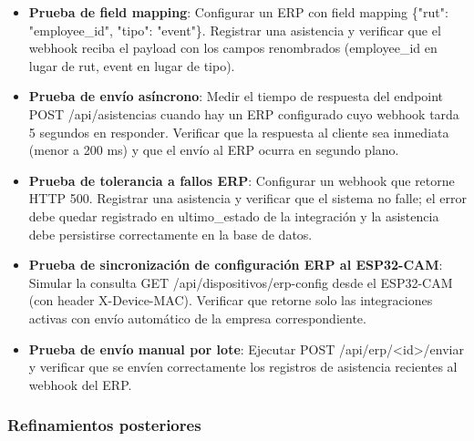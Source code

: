\begin{itemize}
    \item \textbf{Prueba de field mapping}: Configurar un ERP con field mapping \{"rut": "employee\_id", "tipo": "event"\}. Registrar una asistencia y verificar que el webhook reciba el payload con los campos renombrados (employee\_id en lugar de rut, event en lugar de tipo).

    \item \textbf{Prueba de envío asíncrono}: Medir el tiempo de respuesta del endpoint POST /api/asistencias cuando hay un ERP configurado cuyo webhook tarda 5 segundos en responder. Verificar que la respuesta al cliente sea inmediata (menor a 200 ms) y que el envío al ERP ocurra en segundo plano.

    \item \textbf{Prueba de tolerancia a fallos ERP}: Configurar un webhook que retorne HTTP 500. Registrar una asistencia y verificar que el sistema no falle; el error debe quedar registrado en ultimo\_estado de la integración y la asistencia debe persistirse correctamente en la base de datos.

    \item \textbf{Prueba de sincronización de configuración ERP al ESP32-CAM}: Simular la consulta GET /api/dispositivos/erp-config desde el ESP32-CAM (con header X-Device-MAC). Verificar que retorne solo las integraciones activas con envío automático de la empresa correspondiente.

    \item \textbf{Prueba de envío manual por lote}: Ejecutar POST /api/erp/<id>/enviar y verificar que se envíen correctamente los registros de asistencia recientes al webhook del ERP.
\end{itemize}

\subsubsection{Refinamientos posteriores}


